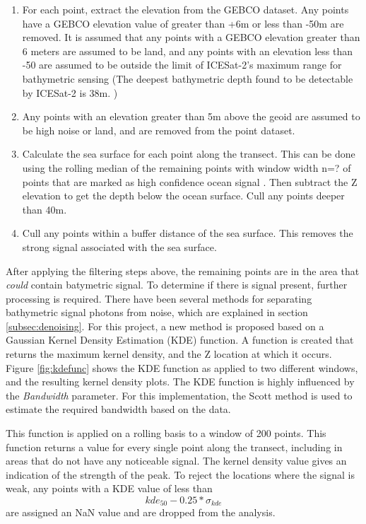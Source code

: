 \begin{enumerate}
    \item For each point, extract the elevation from the GEBCO dataset. Any points have a GEBCO elevation value of greater than +6m or less than -50m are removed. It is assumed that any points with a GEBCO elevation greater than 6 meters are assumed to be land, and any points with an elevation less than -50 are assumed to be outside the limit of ICESat-2's maximum range for bathymetric sensing (The deepest bathymetric depth found to be detectable by ICESat-2 is 38m. \parencite{Parrish2019})
    
    \item Any points with an elevation greater than 5m above the geoid are assumed to be high noise or land, and are removed from the point dataset.

    \item Calculate the sea surface for each point along the transect. This can be done using the rolling median of the remaining points with window width n=? of points that are marked as high confidence ocean signal \parencite{Ranndal2021}. Then subtract the Z elevation to get the depth below the ocean surface.  Cull any points deeper than 40m. 
    \item Cull any points within a buffer distance of the sea surface. This removes the strong signal associated with the sea surface.
\end{enumerate}

After applying the filtering steps above, the remaining points are in the area that \emph{could} contain batymetric signal. To determine if there is signal present, further processing is required. There have been several methods for separating bathymetric signal photons from noise, which are explained in section \ref{subsec:denoising}. For this project, a new method is proposed based on a Gaussian Kernel Density Estimation (KDE) function. A function is created that returns the maximum kernel density, and the Z location at which it occurs. Figure \ref{fig:kdefunc} shows the KDE function as applied to two different windows, and the resulting kernel density plots. The KDE function is highly influenced by the \emph{Bandwidth} parameter. For this implementation, the Scott method \citeauthor{Scott2015} is used to estimate the required bandwidth based on the data. 

This function is applied on a rolling basis to a window of 200 points. This function returns a value for every single point along the transect, including in areas that do not have any noticeable signal. The kernel density value gives an indication of the strength of the peak. To reject the locations where the signal is weak, any points with a KDE value of less than $$ kde_{50} - 0.25 * \sigma_{kde} $$  are assigned an NaN value and are dropped from the analysis.


